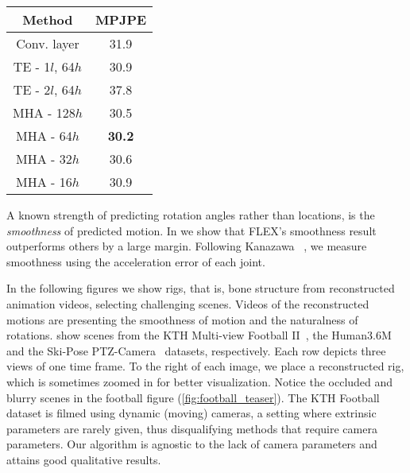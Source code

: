 \begin{table}[t!]
\begin{minipage}{.36\linewidth}
\begin{center}
\begin{tabular}{|c|c|}
\textbf{Method} & \textbf{MPJPE} \\

\hline
Conv. layer & 31.9 \\
\hline
TE - 1$l$, 64$h$ & 30.9 \\
\hline
TE - 2$l$, 64$h$ & 37.8 \\
\hline
MHA - 128$h$ & 30.5 \\
\hline
MHA - 64$h$ & \textbf{30.2} \\
\hline
MHA - 32$h$ & 30.6 \\
\hline
MHA - 16$h$ & 30.9 \\
\hline

\end{tabular}
\end{center}
         \label{tab:fusion_arch}
    \end{minipage}
    \hfill
    \hphantom{.} 

\setlength{\abovecaptionskip}{-35pt plus 3pt minus 2pt}
\setlength{\belowcaptionskip}{-0pt plus 3pt minus 2pt}
\caption*{}

\end{table} 
A known strength of predicting rotation angles rather than locations, is the \emph{smoothness} of predicted motion. 
In  we show that FLEX's smoothness result outperforms others by a large margin. Following Kanazawa \etal~\cite{kanazawa2019learning}, we measure smoothness using the acceleration error of each joint. 





In the following figures we show rigs, that is, bone structure 
from reconstructed animation videos, selecting challenging scenes. Videos of the reconstructed motions are  
\fi
presenting the smoothness of motion and the naturalness of rotations. 
 show scenes from the KTH Multi-view Football II~\cite{footballDS}, the Human3.6M~\cite{h36m_pami,IonescuSminchisescu11} and the Ski-Pose PTZ-Camera~\cite{ski_ptz} datasets, respectively. 
Each row depicts three views of one time frame. To the right of each image, we place a reconstructed rig, which is sometimes zoomed in for better visualization. 
Notice the occluded and blurry scenes in the football figure (\ref{fig:football_teaser}). The KTH Football dataset is filmed using dynamic (moving) cameras, 
a setting where extrinsic parameters are rarely given, thus disqualifying methods that require camera parameters.
Our algorithm is agnostic to the lack of camera parameters and attains good qualitative results. 

